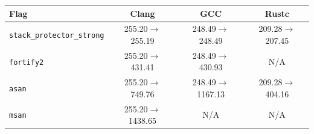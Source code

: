 \begin{tabular*}{\columnwidth}{@{\extracolsep\fill}lccc@{\extracolsep\fill}}
\toprule
\textbf{Flag} & \textbf{Clang} & \textbf{GCC} & \textbf{Rustc} \\
\midrule
\texttt{stack\_protector\_strong} & 255.20$\to$255.19 & 248.49$\to$248.49 & 209.28$\to$207.45 \\
\texttt{fortify2} & 255.20$\to$431.41 & 248.49$\to$430.93 & N/A \\
\texttt{asan} & 255.20$\to$749.76 & 248.49$\to$1167.13 & 209.28$\to$404.16 \\
\texttt{msan} & 255.20$\to$1438.65 & N/A & N/A \\
\bottomrule
\end{tabular*}
